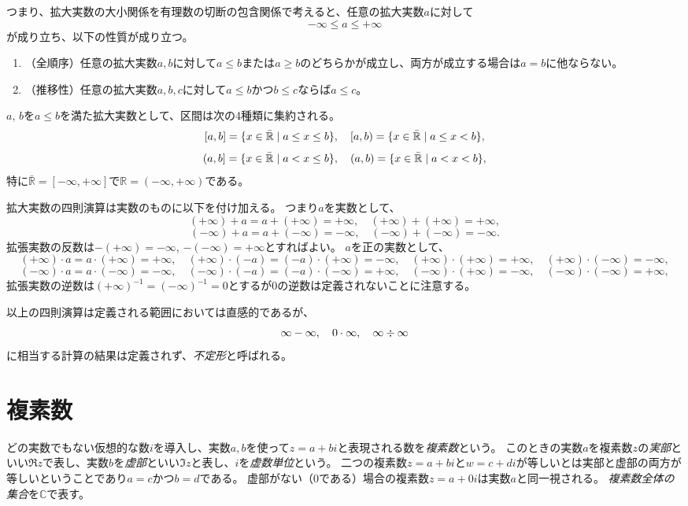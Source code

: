 つまり、拡大実数の大小関係を有理数の切断の包含関係で考えると、任意の拡大実数$a$に対して
$$
-\infty \le a \le +\infty
$$
が成り立ち、以下の性質が成り立つ。
\begin{enumerate}
\item
（全順序）任意の拡大実数$a, b$に対して$a \le b$または$a \ge b$のどちらかが成立し、両方が成立する場合は$a = b$に他ならない。
\item
（推移性）任意の拡大実数$a, b, c$に対して$a \le b$かつ$b \le c$ならば$a \le c$。
\end{enumerate}

$a$, $b$を$a \le b$を満た拡大実数として、区間は次の4種類に集約される。
$$
[a, b] = \{ x \in \bar{\mathbb{R}} \mid a \le x \le b \},
\quad [a, b) = \{ x \in \bar{\mathbb{R}} \mid a \le x < b \},
$$
$$
(a, b] = \{ x \in \bar{\mathbb{R}} \mid a < x \le b \},
\quad (a, b) = \{ x \in \bar{\mathbb{R}} \mid a < x < b \},
$$
特に$\bar{\mathbb{R}} = [-\infty, +\infty]$で$\mathbb{R} = (-\infty, +\infty)$である。

拡大実数の四則演算は実数のものに以下を付け加える。
つまり$a$を実数として、
$$
(+\infty)+a = a+(+\infty) = +\infty,
\quad (+\infty)+(+\infty) = +\infty,
$$
$$
(-\infty)+a = a+(-\infty) = -\infty,
\quad (-\infty)+(-\infty) = -\infty.
$$
拡張実数の反数は$-(+\infty) = -\infty$, $-(-\infty) = +\infty$とすればよい。
$a$を正の実数として、
$$
(+\infty)\cdot a = a\cdot (+\infty) = +\infty,
\quad (+\infty)\cdot (-a) = (-a)\cdot (+\infty) = -\infty,
\quad (+\infty)\cdot (+\infty) = +\infty,
\quad (+\infty)\cdot (-\infty) = -\infty,
$$
$$
(-\infty)\cdot a = a\cdot (-\infty) = -\infty,
\quad (-\infty)\cdot (-a) = (-a)\cdot (-\infty) = +\infty,
\quad (-\infty)\cdot (+\infty) = -\infty,
\quad (-\infty)\cdot (-\infty) = +\infty,
$$
拡張実数の逆数は$(+\infty)^{-1} = (-\infty)^{-1} = 0$とするが$0$の逆数は定義されないことに注意する。

以上の四則演算は定義される範囲においては直感的であるが、
$$
\infty-\infty,
\quad 0\cdot \infty,
\quad \infty\divs \infty
$$
に相当する計算の結果は定義されず、\emph{不定形}と呼ばれる。

\section{複素数}

どの実数でもない仮想的な数$i$を導入し、実数$a, b$を使って$z = a+b i$と表現される数を\emph{複素数}という。
このときの実数$a$を複素数$z$の\emph{実部}といい$\Re z$で表し、実数$b$を\emph{虚部}といい$\Im z$と表し、$i$を\emph{虚数単位}という。
二つの複素数$z = a+b i$と$w = c+d i$が等しいとは実部と虚部の両方が等しいということであり$a = c$かつ$b = d$である。
虚部がない（$0$である）場合の複素数$z = a+0 i$は実数$a$と同一視される。
\emph{複素数全体の集合}を$\mathbb{C}$で表す。

